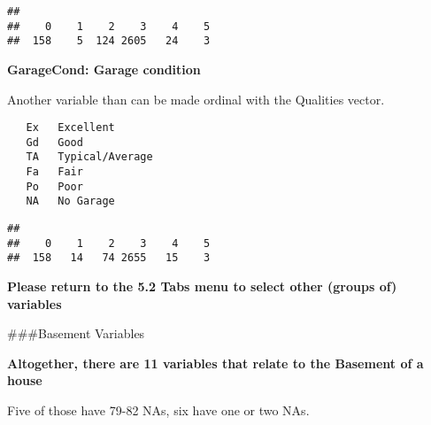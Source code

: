 \documentclass[]{article}
\newenvironment{Shaded}{\begin{snugshade}}{\end{snugshade}}
\newcommand{\CommentTok}[1]{\textcolor[rgb]{0.56,0.35,0.01}{\textit{#1}}}
\newcommand{\KeywordTok}[1]{\textcolor[rgb]{0.13,0.29,0.53}{\textbf{#1}}}
\newcommand{\NormalTok}[1]{#1}
\newcommand{\OperatorTok}[1]{\textcolor[rgb]{0.81,0.36,0.00}{\textbf{#1}}}
\newcommand{\StringTok}[1]{\textcolor[rgb]{0.31,0.60,0.02}{#1}}
\begin{document}
\begin{verbatim}
## 
##    0    1    2    3    4    5 
##  158    5  124 2605   24    3
\end{verbatim}

\textbf{GarageCond: Garage condition}

Another variable than can be made ordinal with the Qualities vector.

\begin{verbatim}
   Ex   Excellent
   Gd   Good
   TA   Typical/Average
   Fa   Fair
   Po   Poor
   NA   No Garage
\end{verbatim}

\begin{Shaded}
\end{Shaded}

\begin{verbatim}
## 
##    0    1    2    3    4    5 
##  158   14   74 2655   15    3
\end{verbatim}

\textbf{Please return to the 5.2 Tabs menu to select other (groups of)
variables}

\#\#\#Basement Variables

\textbf{Altogether, there are 11 variables that relate to the Basement
of a house}

Five of those have 79-82 NAs, six have one or two NAs.

\begin{Shaded}
\end{Shaded}
\end{document}
